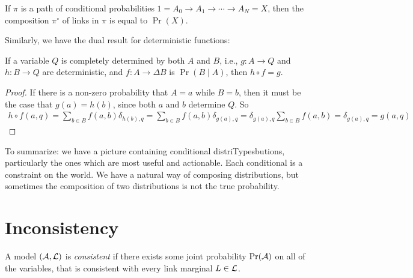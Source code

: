 \documentclass{article}
\begin{document}
	\begin{prop}\label{prop:prob-eq}
		If $\pi$ is a path of conditional probabilities $1 = A_0 \to A_1\to\cdots \to A_N = X$, then the composition $\pi^\circ$ of links in $\pi$ is equal to $\Pr(X)$.
	\end{prop}

	Similarly, we have the dual result for deterministic functions:
	\begin{prop}\label{prop:det-eq}
		If a variable $Q$ is completely determined by both $A$ and $B$, i.e., $g : A\to Q$ and $h : B\to Q$ are deterministic, and $f : A \to \Delta B$ is $\Pr(B \mid A)$, then $h \circ f = g$. 
	\end{prop}
	\begin{proof}
		If there is a non-zero probability that $A = a$ while $B = b$, then it must be the case that $g(a) = h(b)$, since both $a$ and $b$ determine $Q$. So
		\begin{align*}
			h \circ f(a,q) = \sum_{b \in B} f(a,b) \delta_{h(b),q}	
					= \sum_{b \in B} f(a,b) \delta_{g(a), q} 
					= \delta_{g(a),q} \sum_{b \in B} f(a,b) 
					= \delta_{g(a),q} 
					= g(a, q)
		\end{align*}
	\end{proof}

	To summarize: we have a picture containing conditional distriTypesbutions, particularly the ones which are most useful and actionable. Each conditional is a constraint on the world. We have a natural way of composing distributions, but sometimes the composition of two distributions is not the true probability.
	
	\section{Inconsistency}
		
	\begin{defn}[consistency]
		A model $(\cal A, L)$ is \emph{consistent} if there exists some joint probability $\Pr(\cal A)$ on all of the variables, that is consistent with every link marginal $L \in \cal L$.
	\end{defn}
\end{document}
